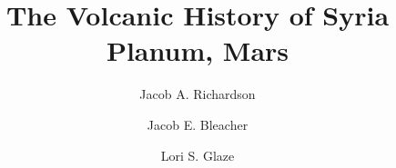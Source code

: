 \documentclass[preprint,review,authoryear,12pt]{elsarticle}
\begin{document}
\begin{frontmatter}



\title{The Volcanic History of Syria Planum, Mars}


\author[usf]{Jacob A. Richardson}
\author[gsfc]{Jacob E. Bleacher}
\author[gsfc]{Lori S. Glaze}


\address[usf]{University of South Florida, Department of Geology, Tampa, FL, United States}
\address[gsfc]{NASA Goddard Space Flight Center, Planetary Geodynamics Lab, Greenbelt, MD, United States}


\end{frontmatter}
\end{document}

